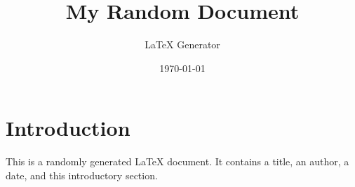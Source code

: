 \documentclass{article}
\title{My Random Document}
\author{LaTeX Generator}
\date{\today}
\begin{document}
\maketitle
\section{Introduction}
This is a randomly generated LaTeX document. It contains a title, an author, a date, and this introductory section.
\end{document}

